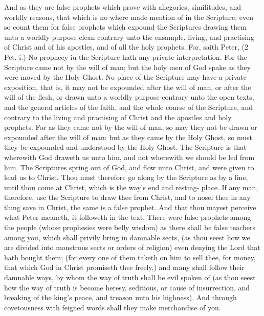And as they are false prophets which prove with allegories,
similitudes, and worldly reasons, that which is no 
where made mention of in the Scripture; even so count 
them for false prophets which expound the Scriptures 
drawing them unto a worldly purpose clean contrary unto 
the ensample, living, and practising of Christ and of his 
apostles, and of all the holy prophets. For, saith Peter, 
(2 Pet. i.) No prophecy iu the Scripture hath any private
interpretation. For the Scripture came not by the will 
of man; but the holy men of God spake as they were 
moved by the Holy Ghost. No place of the Scripture may 
have a private exposition, that is, it may not be expounded 
after the will of man, or after the will of the flesh, or drawn 
unto a worldly purpose contrary unto the open texts, and 
the general articles of the faith, and the whole course of the 
Scripture, and contrary to the living and practising of 
Christ and the apostles and holy prophets. For as they 
came not by the will of man, so may they not be drawn or 
expounded after the will of man: but as they came by the 
Holy Ghost, so must they be expounded and understood by 
the Holy Ghost. The Scripture is that wherewith God 
draweth us unto him, aud not wherewith we should be led 
from him. The Scriptures spring out of God, and flow 
unto Christ, and were given to lead us to Christ. Thou 
must therefore go along by the Scripture as by a line, until 
thou come at Christ, which is the way's end and resting- 
place. If any man, therefore, use the Scripture to draw 
thee from Christ, and to nosel thee in any thing save in 
Christ, the same is a false prophet. And that thou mayest 
perceive what Peter meaneth, it followeth in the text, 
There were false prophets among the people (whose prophesies
were belly wisdom) as there shall be false teachers 
among you, which shall privily bring in damnable sects, 
(as thou seest how we are divided into monstrous sects or 
orders of religion) even denying the Lord that hath 
bought them; (for every one of them taketh on him to 
sell thee, for money, that which God in Christ promiseth 
thee freely,) and many shall follow their damnable ways, 
by whom the way of truth shall be evil spoken of (as thou 
seest how the way of truth is become heresy, seditious, or 
cause of insurrection, and breaking of the king's peace, 
and treason unto his highness). And through covetousness 
with feigned words shall they make merchandise of you. 


